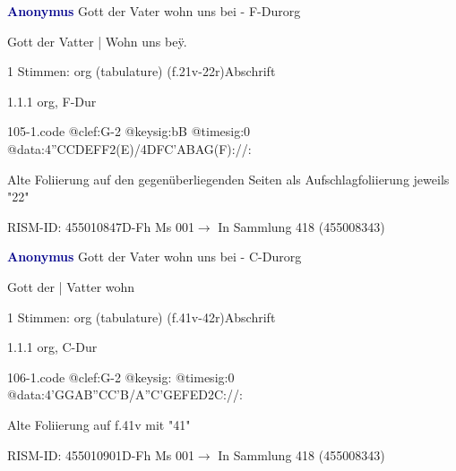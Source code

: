\documentclass[twocolumn]{book}
\begin{document}
\par \vspace{7pt} \textcolor{darkblue}{\textbf{Anonymus  }}\hfillplus{\textbf{[105]}}\newline Gott der Vater wohn uns bei - F-Dur\newline org
\par \begin{itshape}[f.21v, at left:] Gott der Vatter | Wohn uns beÿ.\end{itshape} 
\par \textcolor{darkblue}{}  1 Stimmen: org (tabulature)  (f.21v-22r)\newline Abschrift
\par 1.1.1  org, F-Dur  
\begin{filecontents*}{105-1.code}
@clef:G-2
@keysig:bB
@timesig:0
@data:4''CCDEFF2(E)/4DFC'ABAG(F)://:
\end{filecontents*}
\newline
%
\par Alte Foliierung auf den gegenüberliegenden Seiten als Aufschlagfoliierung jeweils "22"
\par RISM-ID: 455010847\newline D-Fh  Ms 001\newline $\rightarrow$ In Sammlung 418 (455008343)
      
\par \vspace{7pt} \textcolor{darkblue}{\textbf{Anonymus  }}\hfillplus{\textbf{[106]}}\newline Gott der Vater wohn uns bei - C-Dur\newline org
\par \begin{itshape}[f.41v, at left:] Gott der | Vatter wohn\end{itshape} 
\par \textcolor{darkblue}{}  1 Stimmen: org (tabulature)  (f.41v-42r)\newline Abschrift
\par 1.1.1  org, C-Dur  
\begin{filecontents*}{106-1.code}
@clef:G-2
@keysig:
@timesig:0
@data:4'GGAB''CC'B/A''C'GEFED2C://:
\end{filecontents*}
\newline
%
\par Alte Foliierung auf f.41v mit "41"
\par RISM-ID: 455010901\newline D-Fh  Ms 001\newline $\rightarrow$ In Sammlung 418 (455008343)
      
\end{document}
